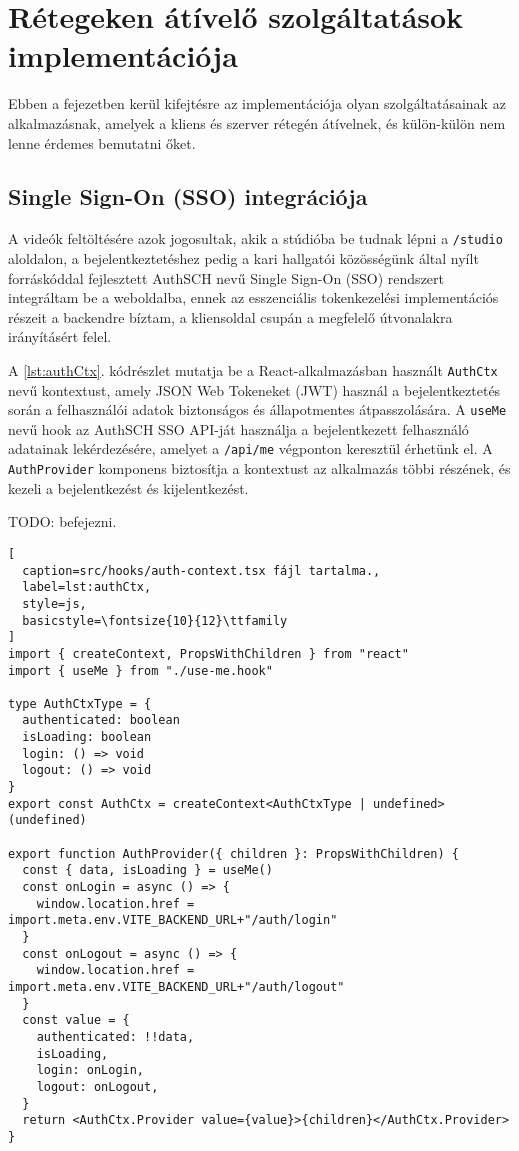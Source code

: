 \chapter{Rétegeken átívelő szolgáltatások implementációja}

Ebben a fejezetben kerül kifejtésre az implementációja olyan szolgáltatásainak az alkalmazásnak, amelyek a kliens és szerver rétegén átívelnek, és külön-külön nem lenne érdemes bemutatni őket.

\section{Single Sign-On (SSO) integrációja}

A videók feltöltésére azok jogosultak, akik a stúdióba be tudnak lépni a \verb|/studio| aloldalon, a bejelentkeztetéshez pedig a kari hallgatói közösségünk által nyílt forráskóddal fejlesztett AuthSCH nevű Single Sign-On (SSO) rendszert integráltam be a weboldalba,  ennek az esszenciális tokenkezelési implementációs részeit a backendre bíztam, a kliensoldal csupán a megfelelő útvonalakra irányításért felel.

A \ref{lst:authCtx}. kódrészlet mutatja be a React-alkalmazásban használt \verb|AuthCtx| nevű kontextust, amely JSON Web Tokeneket (JWT) használ a bejelentkeztetés során a felhasználói adatok biztonságos és állapotmentes átpasszolására. A \verb|useMe| nevű hook az AuthSCH SSO API-ját használja a bejelentkezett felhasználó adatainak lekérdezésére, amelyet a \verb|/api/me| végponton keresztül érhetünk el. A \verb|AuthProvider| komponens biztosítja a kontextust az alkalmazás többi részének, és kezeli a bejelentkezést és kijelentkezést.

TODO: befejezni.

\begin{minipage}{0.92\textwidth}
  \begin{lstlisting}[
  caption=src/hooks/auth-context.tsx fájl tartalma.,
  label=lst:authCtx,
  style=js,
  basicstyle=\fontsize{10}{12}\ttfamily
]
import { createContext, PropsWithChildren } from "react"
import { useMe } from "./use-me.hook"

type AuthCtxType = {
  authenticated: boolean
  isLoading: boolean
  login: () => void
  logout: () => void
}
export const AuthCtx = createContext<AuthCtxType | undefined>(undefined)

export function AuthProvider({ children }: PropsWithChildren) {
  const { data, isLoading } = useMe()
  const onLogin = async () => {
    window.location.href = import.meta.env.VITE_BACKEND_URL+"/auth/login"
  }
  const onLogout = async () => {
    window.location.href = import.meta.env.VITE_BACKEND_URL+"/auth/logout"
  }
  const value = {
    authenticated: !!data,
    isLoading,
    login: onLogin,
    logout: onLogout,
  }
  return <AuthCtx.Provider value={value}>{children}</AuthCtx.Provider>
}
\end{lstlisting}
\end{minipage}

